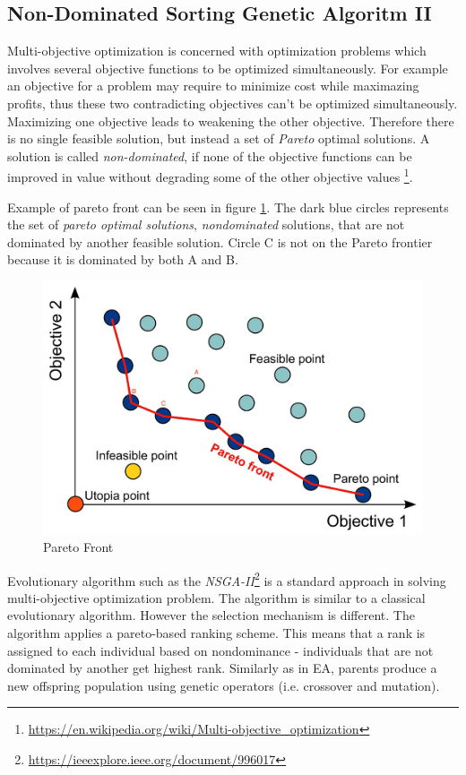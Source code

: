 \documentclass[format=acmsmall, review=false, screen=true]{acmart}
\begin{document}
\subsection{Non-Dominated Sorting Genetic Algoritm II}

Multi-objective optimization is concerned with optimization problems which involves several objective functions to be optimized simultaneously. For example an objective for a problem may require to minimize cost while maximazing profits, thus these two contradicting objectives can't be optimized simultaneously. Maximizing one objective leads to weakening the other objective. Therefore there is no single feasible solution, but instead a set of \emph{Pareto} optimal solutions.  A solution is called \emph{non-dominated}, if none of the objective functions can be improved in value without degrading some of the other objective values \footnote{\url{https://en.wikipedia.org/wiki/Multi-objective_optimization}}.

Example of pareto front can be seen in figure \ref{fig:paretofront}. The dark blue circles represents the set of \emph{pareto optimal solutions}, \emph{nondominated} solutions, that are not dominated by another feasible solution. Circle C is not on the Pareto frontier because it is dominated by both A and B.

\begin{figure}[H]
  \includegraphics[width=0.66\linewidth]{img/pareto_front.JPG}
  \caption{\label{fig:paretofront}Pareto Front}
\end{figure}

Evolutionary algorithm such as the \emph{NSGA-II}\footnote{\url{https://ieeexplore.ieee.org/document/996017}} is a standard approach in solving multi-objective optimization problem. The algorithm is similar to a classical evolutionary algorithm. However the selection mechanism is different. The algorithm applies a pareto-based ranking scheme. This means that a rank is assigned to each individual based on nondominance - individuals that are not dominated by another get highest rank. Similarly as in EA, parents produce a new offspring population using genetic operators (i.e. crossover and mutation).
\end{document}
